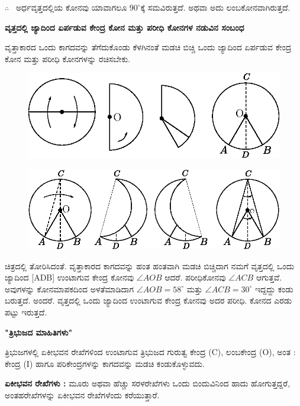  $\therefore $~ ಅರ್ಧವೃತ್ತದಲ್ಲಿಯ ಕೋನವು ಯಾವಾಗಲೂ  $90^\circ$ಕ್ಕೆ  ಸಮವಿರುತ್ತದೆ. ಅಥವಾ ಅದು ಲಂಬಕೋನವಾಗಿರುತ್ತದೆ. 
 
 \vfill\eject
 
 \medskip
 \noindent
 \textbf{ವೃತ್ತದಲ್ಲಿ ಜ್ಯಾದಿಂದ  ಏರ್ಪಡುವ ಕೇಂದ್ರ ಕೋನ ಮತ್ತು ಪರೀಧಿ ಕೋನಗಳ ನಡುವಿನ ಸಂಬಂಧ}
 
ವೃತ್ತಾಕಾರದ ಒಂದು ಕಾಗದವನ್ನು ತೆಗೆದುಕೊಂಡು ಕೆಳಗಿನಂತೆ ಮಡಚಿ ಬಿಚ್ಚಿ ಒಂದು ಜ್ಯಾದಿಂದ ಏರ್ಪಡುವ ಕೇಂದ್ರ ಕೋನ ಮತ್ತು ಪರೀಧಿ ಕೋನಗಳನ್ನು ರಚಿಸಬೇಕು. 
\begin{figure}[H]
\centering
\includegraphics[scale=.98]{src/figure/chap1/fig1-34a.eps}
\end{figure}
    \begin{figure}[H]
\centering
\includegraphics[scale=.98]{src/figure/chap1/fig1-34b.eps}
\end{figure}
 
 ಚಿತ್ರದಲ್ಲಿ ತೋರಿಸಿದಂತೆ. ವೃತ್ತಾಕಾರದ ಕಾಗದವನ್ನು ಹಂತ ಹಂತವಾಗಿ ಮಡಚಿ ಬಿಚ್ಚಿದಾಗ ನಮಗೆ ವೃತ್ತದಲ್ಲಿ ಒಂದು ಜ್ಯಾದಿಂದ [ADB] ಉಂಟಾಗುವ ಕೇಂದ್ರ ಕೋನವು $\angle AOB$  ಆದರೆ. ಪರೀಧಿಕೋನವು $\angle ACB$ ಆಗುತ್ತವೆ. ಅವುಗಳನ್ನು ಕೋನಮಾಪಕದಿಂದ ಅಳತೆಮಾಡಿದಾಗ $\angle AOB = 58^\circ$ ಮತ್ತು $\angle ACB = 30^\circ$ ಇದ್ದದ್ದು ಕಂಡು ಬರುತ್ತದೆ. ಅಂದರೆ. ವೃತ್ತದಲ್ಲಿ ಒಂದು ಜ್ಯಾದಿಂದ ಉಂಟಾಗುವ ಕೇಂದ್ರ ಕೋನವು ಅದರ ಪರೀಧಿ. ಕೋನದ ಎರಡು ಪಟ್ಟು ಇರುತ್ತದೆ. 
 
 \medskip
 \noindent
  \textbf{"ತ್ರಿಭುಜದ ಮಾಹಿತಿಗಳು"}
  
  ತ್ರಿಭುಜಗಳಲ್ಲಿ ಏಕೀಭವನ ರೇಖೆಗಳಿಂದ ಉಂಟಾಗುವ ತ್ರಿಭುಜದ ಗುರುತ್ವ ಕೇಂದ್ರ (C), ಲಂಬಕೇಂದ್ರ  (O), ಅಂತ : ಕೇಂದ್ರ (I) ಹಾಗೂ  ಪರಿಕೇಂದ್ರಗಳನ್ನು ಕಾಗದವನ್ನು ಮಡಚಿ ಕಂಡುಕೊಳ್ಳುವದು. 
  
  \noindent
    \textbf{ಏಕೀಭವನ ರೇಖೆಗಳು :} ಮೂರು ಅಥವಾ ಹೆಚ್ಚು ಸರಳರೇಖೆಗಳು ಒಂದು ಬಿಂದುವಿನಿಂದ ಹಾದು ಹೋಗುತ್ತದ್ದರೆ, ಅಂತಹರೇಖೆಗಳನ್ನು ಏಕೀಭವನ ರೇಖೆಗಳೆಂದು ಕರೆಯುತ್ತಾರೆ. 
    
